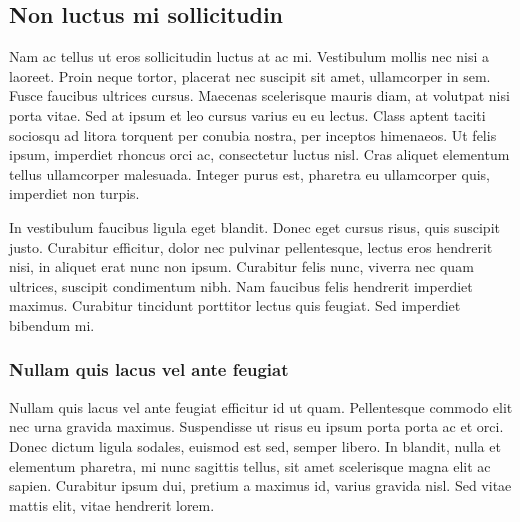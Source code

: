 \subsection{Non luctus mi sollicitudin}

Nam ac tellus ut eros sollicitudin luctus at ac mi. Vestibulum mollis nec nisi a laoreet. Proin neque tortor, placerat nec suscipit sit amet, ullamcorper in sem. Fusce faucibus ultrices cursus. Maecenas scelerisque mauris diam, at volutpat nisi porta vitae. Sed at ipsum et leo cursus varius eu eu lectus. Class aptent taciti sociosqu ad litora torquent per conubia nostra, per inceptos himenaeos. Ut felis ipsum, imperdiet rhoncus orci ac, consectetur luctus nisl. Cras aliquet elementum tellus ullamcorper malesuada. Integer purus est, pharetra eu ullamcorper quis, imperdiet non turpis.

In vestibulum faucibus ligula eget blandit. Donec eget cursus risus, quis suscipit justo. Curabitur efficitur, dolor nec pulvinar pellentesque, lectus eros hendrerit nisi, in aliquet erat nunc non ipsum. Curabitur felis nunc, viverra nec quam ultrices, suscipit condimentum nibh. Nam faucibus felis hendrerit imperdiet maximus. Curabitur tincidunt porttitor lectus quis feugiat. Sed imperdiet bibendum mi.

\subsubsection{Nullam quis lacus vel ante feugiat}

Nullam quis lacus vel ante feugiat efficitur id ut quam. Pellentesque commodo elit nec urna gravida maximus. Suspendisse ut risus eu ipsum porta porta ac et orci. Donec dictum ligula sodales, euismod est sed, semper libero. In blandit, nulla et elementum pharetra, mi nunc sagittis tellus, sit amet scelerisque magna elit ac sapien. Curabitur ipsum dui, pretium a maximus id, varius gravida nisl. Sed vitae mattis elit, vitae hendrerit lorem. 


